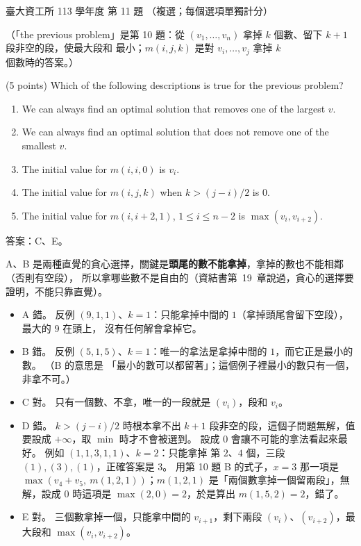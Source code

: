 \begin{pastexam}[label={px:ntu-113-dsa-11}]{臺大資工所 113 學年度 第 11 題}
（複選；每個選項單獨計分）

（「the previous problem」是第 10 題：從 $(v_1,\ldots,v_n)$ 拿掉 $k$ 個數、留下 $k+1$ 段非空的段，使最大段和
最小；$m(i,j,k)$ 是對 $v_i,\ldots,v_j$ 拿掉 $k$ 個數時的答案。）

(5 points) Which of the following descriptions is true for the previous problem?
\begin{enumerate}[label=\Alph*.]
\item We can always find an optimal solution that removes one of the largest $v$.
\item We can always find an optimal solution that does not remove one of the smallest $v$.
\item The initial value for $m(i,i,0)$ is $v_i$.
\item The initial value for $m(i,j,k)$ when $k>(j-i)/2$ is 0.
\item The initial value for $m(i,i+2,1)$, $1\le i\le n-2$ is $\max(v_i,v_{i+2})$.
\end{enumerate}
\end{pastexam}

\begin{pastsoln}
答案：C、E。

A、B 是兩種直覺的貪心選擇，關鍵是\textbf{頭尾的數不能拿掉}，拿掉的數也不能相鄰（否則有空段），
所以拿哪些數不是自由的（資結書第~19~章說過，貪心的選擇要證明，不能只靠直覺）。
\begin{itemize}
\item A 錯。 反例 $(9, 1, 1)$、$k = 1$：只能拿掉中間的 $1$（拿掉頭尾會留下空段），最大的 $9$ 在頭上，
沒有任何解會拿掉它。
\item B 錯。 反例 $(5, 1, 5)$、$k = 1$：唯一的拿法是拿掉中間的 $1$，而它正是最小的數。 （B 的意思是
「最小的數可以都留著」；這個例子裡最小的數只有一個，非拿不可。）
\item C 對。 只有一個數、不拿，唯一的一段就是 $(v_i)$，段和 $v_i$。
\item D 錯。 $k > (j - i)/2$ 時根本拿不出 $k + 1$ 段非空的段，這個子問題無解，值要設成 $+\infty$，取
$\min$ 時才不會被選到。 設成 $0$ 會讓不可能的拿法看起來最好。 例如 $(1, 1, 3, 1, 1)$、$k = 2$：只能拿掉
第 $2$、$4$ 個，三段 $(1), (3), (1)$，正確答案是 $3$。 用第 10 題 B 的式子，$x = 3$ 那一項是
$\max(v_4 + v_5,\ m(1, 2, 1))$；$m(1, 2, 1)$ 是「兩個數拿掉一個留兩段」，無解，設成 $0$ 時這項是
$\max(2, 0) = 2$，於是算出 $m(1, 5, 2) = 2$，錯了。
\item E 對。 三個數拿掉一個，只能拿中間的 $v_{i+1}$，剩下兩段 $(v_i)$、$(v_{i+2})$，最大段和
$\max(v_i, v_{i+2})$。
\end{itemize}
\end{pastsoln}
